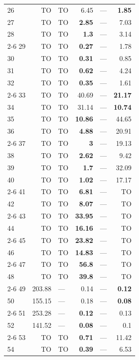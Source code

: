 \begin{longtable}{lr@{\hskip 4pt}l@{\hskip 12pt}r@{\hskip 4pt}l@{\hskip 12pt}r}
26 & TO & TO & 6.45 & --- & \textbf{1.85} \\
27 & TO & TO & \textbf{2.85} & --- & 7.03 \\
28 & TO & TO & \textbf{1.3} & --- & 3.14 \\
\cmidrule{2-6}
29 & TO & TO & \textbf{0.27} & --- & 1.78 \\
30 & TO & TO & \textbf{0.31} & --- & 0.85 \\
31 & TO & TO & \textbf{0.62} & --- & 4.24 \\
32 & TO & TO & \textbf{0.35} & --- & 1.61 \\
\cmidrule{2-6}
33 & TO & TO & 40.69 & --- & \textbf{21.17} \\
34 & TO & TO & 31.14 & --- & \textbf{10.74} \\
35 & TO & TO & \textbf{10.86} & --- & 44.65 \\
36 & TO & TO & \textbf{4.88} & --- & 20.91 \\
\cmidrule{2-6}
37 & TO & TO & \textbf{3} & --- & 19.13 \\
38 & TO & TO & \textbf{2.62} & --- & 9.42 \\
39 & TO & TO & \textbf{1.7} & --- & 32.09 \\
40 & TO & TO & \textbf{1.02} & --- & 17.17 \\
\cmidrule{2-6}
41 & TO & TO & \textbf{6.81} & --- & TO \\
42 & TO & TO & \textbf{8.07} & --- & TO \\
\cmidrule{2-6}
43 & TO & TO & \textbf{33.95} & --- & TO \\
44 & TO & TO & \textbf{16.16} & --- & TO \\
\cmidrule{2-6}
45 & TO & TO & \textbf{23.82} & --- & TO \\
46 & TO & TO & \textbf{14.83} & --- & TO \\
\cmidrule{2-6}
47 & TO & TO & \textbf{56.8} & --- & TO \\
48 & TO & TO & \textbf{39.8} & --- & TO \\
\cmidrule{2-6}
49 & 203.88 & --- & 0.14 & --- & \textbf{0.12} \\
50 & 155.15 & --- & 0.18 & --- & \textbf{0.08} \\
\cmidrule{2-6}
51 & 253.28 & --- & \textbf{0.12} & --- & 0.13 \\
52 & 141.52 & --- & \textbf{0.08} & --- & 0.1 \\
\cmidrule{2-6}
53 & TO & TO & \textbf{0.71} & --- & 11.42 \\
54 & TO & TO & \textbf{0.39} & --- & 6.53 \\

\end{longtable}
